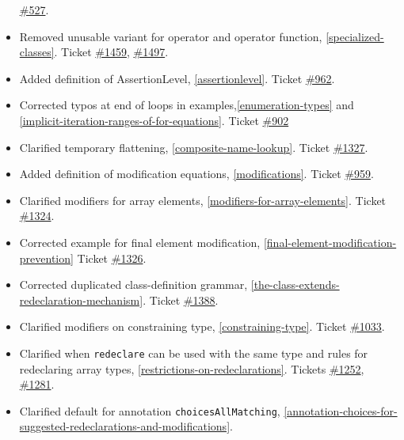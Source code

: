 \begin{itemize}
  \href{https://github.com/modelica/ModelicaSpecification/issues/527}{\#527}.
\item
  Removed unusable variant for operator and operator function, \cref{specialized-classes}. Ticket
  \href{https://github.com/modelica/ModelicaSpecification/issues/1459}{\#1459},
  \href{https://github.com/modelica/ModelicaSpecification/issues/1497}{\#1497}.
\item
  Added definition of AssertionLevel, \cref{assertionlevel}. Ticket
  \href{https://github.com/modelica/ModelicaSpecification/issues/962}{\#962}.
\item
  Corrected typos at end of loops in examples,\cref{enumeration-types} and
  \cref{implicit-iteration-ranges-of-for-equations}. Ticket
  \href{https://github.com/modelica/ModelicaSpecification/issues/902}{\#902}
\item
  Clarified temporary flattening, \cref{composite-name-lookup}. Ticket
  \href{https://github.com/modelica/ModelicaSpecification/issues/1327}{\#1327}.
\item
  Added definition of modification equations, \cref{modifications}. Ticket
  \href{https://github.com/modelica/ModelicaSpecification/issues/959}{\#959}.
\item
  Clarified modifiers for array elements, \cref{modifiers-for-array-elements}. Ticket
  \href{https://github.com/modelica/ModelicaSpecification/issues/1324}{\#1324}.
\item
  Corrected example for final element modification, \cref{final-element-modification-prevention}
  Ticket \href{https://github.com/modelica/ModelicaSpecification/issues/1326}{\#1326}.
\item
  Corrected duplicated class-definition grammar, \cref{the-class-extends-redeclaration-mechanism}. Ticket
  \href{https://github.com/modelica/ModelicaSpecification/issues/1388}{\#1388}.
\item
  Clarified modifiers on constraining type, \cref{constraining-type}. Ticket
  \href{https://github.com/modelica/ModelicaSpecification/issues/1033}{\#1033}.
\item
  Clarified when \lstinline!redeclare! can be used with the same type and rules for redeclaring array types, \cref{restrictions-on-redeclarations}.
  Tickets
  \href{https://github.com/modelica/ModelicaSpecification/issues/1252}{\#1252},
  \href{https://github.com/modelica/ModelicaSpecification/issues/1281}{\#1281}.
\item
  Clarified default for annotation \lstinline!choicesAllMatching!, \cref{annotation-choices-for-suggested-redeclarations-and-modifications}.

\end{itemize}
